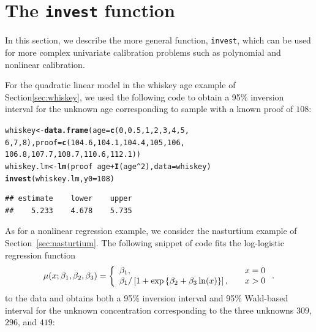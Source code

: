 \documentclass[cmfont,usenames,dvipsnames,leqno]{afit-etd}\usepackage[]{graphicx}\usepackage[]{color}
\makeatletter
\newcommand{\hlnum}[1]{\textcolor[rgb]{0.686,0.059,0.569}{#1}}%
\newcommand{\hlopt}[1]{\textcolor[rgb]{0,0,0}{#1}}%
\newcommand{\hlstd}[1]{\textcolor[rgb]{0.345,0.345,0.345}{#1}}%
\newcommand{\hlkwb}[1]{\textcolor[rgb]{0.69,0.353,0.396}{#1}}%
\newcommand{\hlkwc}[1]{\textcolor[rgb]{0.333,0.667,0.333}{#1}}%
\newcommand{\hlkwd}[1]{\textcolor[rgb]{0.737,0.353,0.396}{\textbf{#1}}}%
\newenvironment{kframe}{%
 \def\at@end@of@kframe{}%
 \ifinner\ifhmode%
  \def\at@end@of@kframe{\end{minipage}}%
  \begin{minipage}{\columnwidth}%
 \fi\fi%
 \def\FrameCommand##1{\hskip\@totalleftmargin \hskip-\fboxsep
 \colorbox{shadecolor}{##1}\hskip-\fboxsep
     \hskip-\linewidth \hskip-\@totalleftmargin \hskip\columnwidth}%
 \MakeFramed {\advance\hsize-\width
   \@totalleftmargin\z@ \linewidth\hsize
   \@setminipage}}%
 {\par\unskip\endMakeFramed%
 \at@end@of@kframe}
\newenvironment{knitrout}{}{} %
\renewenvironment{knitrout}{\begin{singlespace}}{\end{singlespace}}
\newcommand{\code}[1]{\texttt{\small{#1}}}
\makeatother
\begin{document}
\section{The \code{invest} function}
In this section, we describe the more general function, \code{invest}, which can be used for more complex univariate calibration problems such as polynomial and nonlinear calibration.

For the quadratic linear model in the whiskey age example of Section\ref{sec:whiskey}, we used the following code to obtain a 95\% inversion interval for the unknown age corresponding to sample with a known proof of $108$:

\begin{knitrout}
\color{fgcolor}\begin{kframe}
\begin{alltt}
\hlstd{whiskey} \hlkwb{<-} \hlkwd{data.frame}\hlstd{(}\hlkwc{age} \hlstd{=} \hlkwd{c}\hlstd{(}\hlnum{0}\hlstd{,} \hlnum{0.5}\hlstd{,} \hlnum{1}\hlstd{,} \hlnum{2}\hlstd{,} \hlnum{3}\hlstd{,} \hlnum{4}\hlstd{,} \hlnum{5}\hlstd{,}
    \hlnum{6}\hlstd{,} \hlnum{7}\hlstd{,} \hlnum{8}\hlstd{),} \hlkwc{proof} \hlstd{=} \hlkwd{c}\hlstd{(}\hlnum{104.6}\hlstd{,} \hlnum{104.1}\hlstd{,} \hlnum{104.4}\hlstd{,} \hlnum{105}\hlstd{,} \hlnum{106}\hlstd{,}
    \hlnum{106.8}\hlstd{,} \hlnum{107.7}\hlstd{,} \hlnum{108.7}\hlstd{,} \hlnum{110.6}\hlstd{,} \hlnum{112.1}\hlstd{))}
\hlstd{whiskey.lm} \hlkwb{<-} \hlkwd{lm}\hlstd{(proof} \hlopt{~} \hlstd{age} \hlopt{+} \hlkwd{I}\hlstd{(age}\hlopt{^}\hlnum{2}\hlstd{),} \hlkwc{data} \hlstd{= whiskey)}
\hlkwd{invest}\hlstd{(whiskey.lm,} \hlkwc{y0} \hlstd{=} \hlnum{108}\hlstd{)}
\end{alltt}
\begin{verbatim}
## estimate    lower    upper 
##    5.233    4.678    5.735
\end{verbatim}
\end{kframe}
\end{knitrout}


As for a nonlinear regression example, we consider the nasturtium example of Section~\ref{sec:nasturtium}. The following snippet of code fits the log-logistic regression function
\begin{equation*}
  \mu(x; \beta_1, \beta_2, \beta_3) = \left\{ \begin{array}{l l}
                                              \beta_1, &\quad x = 0 \\
                                              \beta_1 / \left[1 + \exp\left\{\beta_2 + \beta_3\ln(x)\right\}\right], &\quad x > 0
                                            \end{array} \right..
\end{equation*}
to the data and obtains both a 95\% inversion interval and 95\% Wald-based interval for the unknown concentration corresponding to the three unknowns $309$, $296$, and $419$:
\end{document}
